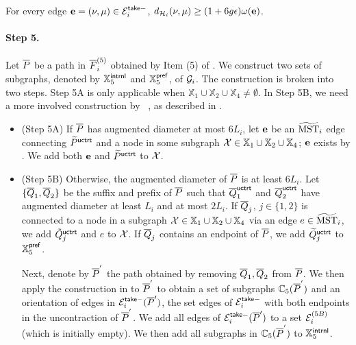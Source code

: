 \begin{observation}\label{obs:greedy-HiE} For every edge $\mathbf{e} = (\nu,\mu)  \in \mathcal{E}_i^{\mathsf{take}-}$, $d_{\mathcal{H}_i }(\nu,\mu) \geq (1+6g\epsilon) \omega(\mathbf{e})$.
\end{observation}





\paragraph{Step 5.~}  
Let $\overline{P}$ be  a path in  $\overline{F}^{(5)}_i$ obtained by Item (5) of . We construct two sets of subgraphs, denoted by $\mathbb{X}^{\mathsf{intrnl}}_5$ and $\mathbb{X}^{\mathsf{pref}}_5$, of $\mathcal{G}_i$. The construction is broken into two steps. Step 5A is only applicable when $\mathbb{X}_1 \cup \mathbb{X}_2\cup \mathbb{X}_4 \not= \emptyset$. In Step 5B, we need a more involved construction by ~\cite{LS19}, as described in . 

\begin{itemize}
	\item (Step 5A)\hypertarget{5A}{}  If $\overline{P}$ has augmented diameter at most $6L_i$, let $\mathbf{e}$ be an $\widetilde{\mathrm{MST}}_i$ edge connecting $\widetilde{P}^{\mathsf{uctrt}}$  and a node in some subgraph $\mathcal{X} \in \mathbb{X}_1\cup \mathbb{X}_2 \cup \mathbb{X}_4$; $\mathbf{e}$ exists by . We add both $\mathbf{e}$ and $\widetilde{P}^{\mathsf{uctrt}}$ to $\mathcal{X}$.
	\item (Step 5B)\hypertarget{5B}{} 	Otherwise,  the augmented diameter of $\overline{P}$ is at least $6L_i$.  Let $\{\overline{Q}_1, \overline{Q}_2\}$ be the suffix and prefix of $\overline{P}$ such that $\overline{Q}^{\mathsf{uctrt}}_1$ and $\overline{Q}^{\mathsf{uctrt}}_2$ have augmented diameter at least $L_i$ and at most $2L_i$. If $\overline{Q}_j$, $j\in \{1,2\}$ is connected to a node in a subgraph $\mathcal{X} \in \mathbb{X}_1 \cup \mathbb{X}_2\cup \mathbb{X}_4$ via an  edge $e\in \widetilde{\mathrm{MST}}_{i}$, we add $\tilde{Q}^{\mathsf{uctrt}}_j$ and $e$ to $\mathcal{X}$. 	If $\overline{Q}_j$ contains an endpoint of $\overline{P}$, we add $\widetilde{Q}_j^{\mathsf{uctrt}}$ to $\mathbb{X}^{\mathsf{pref}}_5$. 
	
	Next, denote by $\overline{P}^{'}$ the path obtained by removing $\overline{Q}_1, \overline{Q}_2$  from $\overline{P}$. We then apply the construction in  to $\overline{P}^{'}$ to obtain a set of subgraphs $\mathbb{C}_5(\overline{P}^{'})$ and an orientation of edges in  $\mathcal{E}^{\mathsf{take}-}_i(\overline{P}')$, the set edges of $\mathcal{E}^{\mathsf{take}-}_i$	with both endpoints in  the uncontraction of $\overline{P}^{'}$. We add all edges of  $\mathcal{E}^{\mathsf{take}-}_i(\overline{P}')$ to a set $\mathcal{E}^{(5B)}_{i}$ (which is initially empty).  We then add all subgraphs in $\mathbb{C}_5(\overline{P}^{'})$ to  $\mathbb{X}^{\mathsf{intrnl}}_5$.
\end{itemize}


